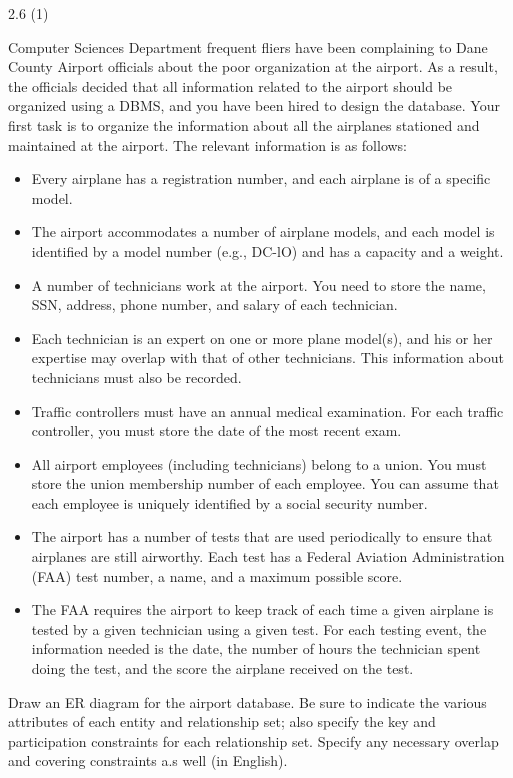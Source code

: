 \begin{problem}{2.6 (1)}

  Computer Sciences Department frequent fliers have been complaining to Dane County Airport officials about the poor
  organization at the airport. As a result, the officials decided that all information related to the airport should be
  organized using a DBMS, and you have been hired to design the database. Your first task is to organize the information
  about all the airplanes stationed and maintained at the airport. The relevant information is as follows:

  \begin{itemize}
    \item Every airplane has a registration number, and each airplane is of a specific model.
    \item The airport accommodates a number of airplane models, and each model is identified by
          a model number (e.g., DC-lO) and has a capacity and a weight.
    \item A number of technicians work at the airport. You need to store the name, SSN, address,
          phone number, and salary of each technician.
    \item Each technician is an expert on one or more plane model(s), and his or her expertise may overlap with that of other technicians.      This information about technicians must also be recorded.
    \item Traffic controllers must have an annual medical examination. For each traffic controller, you must store the
          date of the most   recent exam.
    \item All airport employees (including technicians) belong to a union. You must store the union membership number of
          each employee. You can assume that each employee is uniquely identified by a social security number.
    \item The airport has a number of tests that are used periodically to ensure that airplanes are still airworthy.
          Each test has a Federal Aviation Administration (FAA) test number, a name, and a maximum possible score.
    \item The FAA requires the airport to keep track of each time a given airplane is tested by a given technician using
          a given test. For each testing event, the information needed is the date, the number of hours the technician
          spent doing the test, and the score the airplane received on the test.
  \end{itemize}

  \noindent Draw an ER diagram for the airport database. Be sure to indicate the various attributes of each entity and
  relationship set; also specify the key and participation constraints for each relationship set. Specify any necessary
  overlap and covering constraints a.s well (in English).

  \begin{solution}
  \end{solution}
\end{problem}
\begin{problem}{2.8}
  \begin{solution}
  \end{solution}
\end{problem}



